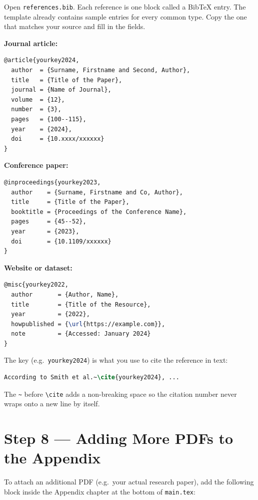 \documentclass[12pt,a4paper]{report}
\begin{document}
Open \texttt{references.bib}. Each reference is one block called a BibTeX entry. The template already contains sample entries for every common type. Copy the one that matches your source and fill in the fields.

\textbf{Journal article:}
\begin{lstlisting}[language=TeX, caption={Journal Article BibTeX Entry}]
@article{yourkey2024,
  author  = {Surname, Firstname and Second, Author},
  title   = {Title of the Paper},
  journal = {Name of Journal},
  volume  = {12},
  number  = {3},
  pages   = {100--115},
  year    = {2024},
  doi     = {10.xxxx/xxxxxx}
}
\end{lstlisting}

\textbf{Conference paper:}
\begin{lstlisting}[language=TeX, caption={Conference Paper BibTeX Entry}]
@inproceedings{yourkey2023,
  author    = {Surname, Firstname and Co, Author},
  title     = {Title of the Paper},
  booktitle = {Proceedings of the Conference Name},
  pages     = {45--52},
  year      = {2023},
  doi       = {10.1109/xxxxxx}
}
\end{lstlisting}

\textbf{Website or dataset:}
\begin{lstlisting}[language=TeX, caption={Website or Dataset BibTeX Entry}]
@misc{yourkey2022,
  author       = {Author, Name},
  title        = {Title of the Resource},
  year         = {2022},
  howpublished = {\url{https://example.com}},
  note         = {Accessed: January 2024}
}
\end{lstlisting}

The key (e.g.\ \texttt{yourkey2024}) is what you use to cite the reference in text:

\begin{lstlisting}[language=TeX, caption={Citing a Reference}]
According to Smith et al.~\cite{yourkey2024}, ...
\end{lstlisting}

The \texttt{\textasciitilde} before \texttt{\textbackslash cite} adds a non-breaking space so the citation number never wraps onto a new line by itself.

\section{Step 8 — Adding More PDFs to the Appendix}

To attach an additional PDF (e.g.\ your actual research paper), add the following block inside the Appendix chapter at the bottom of \texttt{main.tex}:
\end{document}
